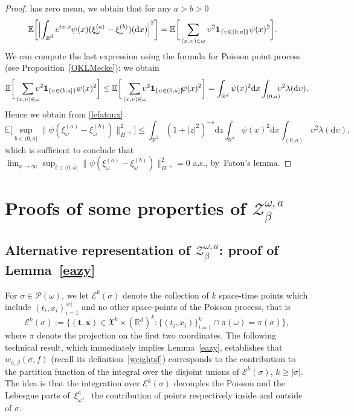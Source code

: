 \documentclass[JEP,XML,SOM,Unicode,published]{cedram}
\let\mathcal\mathscr
\let\sep:
\theoremstyle{definition}
\newcommand{\bt}{\boldsymbol{t}}
\newcommand{\bx}{\boldsymbol{x}}
\newcommand{\dd}{\mathrm{d}}
\newcommand{\ind}{\mathbf{1}}
\newcommand{\cE}{{\ensuremath{\mathcal E}} }
\newcommand{\cP}{{\ensuremath{\mathcal P}} }
\newcommand{\cZ}{{\ensuremath{\mathcal Z}} }
\newcommand{\bbE}{{\ensuremath{\mathbb E}} }
\newcommand{\bbR}{{\ensuremath{\mathbb R}} }
\let\gb\beta
\let\gl\lambda
\let\ups\upsilon
\let\go\omega
\begin{document}
\begin{proof}
has zero mean, we obtain that for any $a>b>0$
\begin{equation*}
\begin{split}
\bbE \biggl[\Bigl | \int_{\bbR^{\bar d}} e^{i z\cdot x} \psi(x)(\xi_{\go}^{(a)}-\xi_{\go}^{(b)})(\dd x) \Bigr|^2 \biggr]
& = \bbE \bigg[ \sum_{(x,\ups)\in \go} \ups^{2} \ind_{\{\ups\in (b,a]\}}\psi(x)^2 \bigg].
\end{split}
\end{equation*}
We can compute the last expression using the formula for Poisson point process (see Proposition~\ref{OKLMecke}): we obtain\vspace*{-5pt}
\[
\bbE \bigg[ \sum_{(x,\ups)\in \go}\hspace*{-2.5mm} \ups^{2} \ind_{\{\ups\in (b,a]\}}\psi(x)^2 \bigg] \le \bbE \bigg[ \sum_{(x,\ups)\in \go} \hspace*{-2.5mm}\ups^{2} \ind_{\{\ups\in (0,a]\}} \hspace*{-1mm}\psi(x)^2 \bigg]
= \int_{\bbR^{\bar d}} \psi(x)^2 \dd x \int_{(0,a)}\hspace*{-2mm} \ups^2 \gl(\dd \ups).
\]
Hence we obtain from \eqref{lefatoux}
\begin{equation*}
\bbE \bigg[ \sup_{b\in(0,a]}\|\psi(\xi_{\go}^{(a)}-\xi_{\go}^{(b)})\|^2_{H^{-s}}\bigg]\le \int_{\bbR^{\bar d}} (1+|z|^2)^{-s} \dd z \int_{\bbR^{\bar d}} \psi(x)^2 \dd x \int_{(0,a)} \ups^2 \gl(\dd \ups),
\end{equation*}
which is sufficient to conclude that $\lim_{a\to \infty} \sup_{b\in(0,a]}\|\psi(\xi_{\go}^{(a)}-\xi_{\go}^{(b)}) \|^2_{H^{-s}}=0$ a.s., by~Fatou's lemma.
\end{proof}

\section{Proofs of some properties of \texorpdfstring{$\cZ_{\gb}^{\go,a}$}{Z}}
\label{app:conti}

\subsection{Alternative representation of \texorpdfstring{$\cZ_{\gb}^{\go,a}$}{Z}: proof of Lemma~\ref{eazy}}
\label{app:eazy}

For $\sigma\in \cP(\go)$, we let $\cE^k(\sigma)$ denote the collection of $k$ space-time points which include $(t_i,x_i)_{i=1}^{|\sigma|}$ and no other space-points of the Poisson process, that is
\begin{equation}
\cE^k(\sigma):= \{ (\bt,\bx)\in \mathfrak{X}^k\times (\bbR^d)^k \sep \{(t_i,x_i)\}_{i=1}^k\cap \pi(\go)= \pi(\sigma) \},
\end{equation}
where $\pi$ denote the projection on the first two coordinates.
The following technical result, which immediately implies Lemma~\ref{eazy}, establishes that $w_{a,\beta}(\sigma,f)$ (recall its definition~\eqref{weightsf}) corresponds to the contribution to the partition function of the integral over the disjoint unions of $ \cE^k(\sigma)$, $k\ge |\sigma|$.
The idea is that the integration over $\cE^k(\sigma)$ decouples the Poisson and the Lebesgue parts of~$\xi_{\go}^{a}$,
\ie \ the contribution of points respectively inside and outside of $\sigma$.
\end{document}
